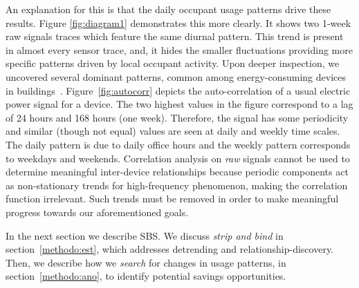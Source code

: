 An explanation for this is that the daily occupant usage patterns %
drive these results.
Figure \ref{fig:diagram1} demonstrates this more clearly.  It shows two 1-week raw signals traces which feature the same 
diurnal pattern.  
This trend is present in almost every sensor trace, and, it hides 
the smaller fluctuations providing more specific patterns driven by local occupant activity.  Upon deeper inspection, we uncovered several
 dominant patterns, common among energy-consuming devices in buildings~\cite{wrinch:pes2012}.  Figure~\ref{fig:autocorr} depicts the 
 auto-correlation of a usual electric power signal for a device.  The two highest values in the figure correspond to a lag of 24 hours and 168 hours (one week).  
 Therefore, the signal has some periodicity and similar (though not equal) values are seen at daily and weekly time scales.
The daily pattern is due to daily office hours and the weekly pattern corresponds to weekdays and weekends.  
Correlation analysis on \emph{raw} signals cannot be used to determine meaningful 
inter-device relationships because periodic components act as non-stationary trends for high-frequency phenomenon, 
 making the correlation function irrelevant.  %
Such trends must be removed in order to make meaningful progress towards our aforementioned goals.  

In the next section we describe SBS.  
We discuss \emph{strip and bind} in section~\ref{methodo:est}, which addresses detrending and
relationship-discovery.  Then, we describe how we \emph{search} for changes in usage patterns, 
in section~\ref{methodo:ano}, to identify potential savings opportunities.

